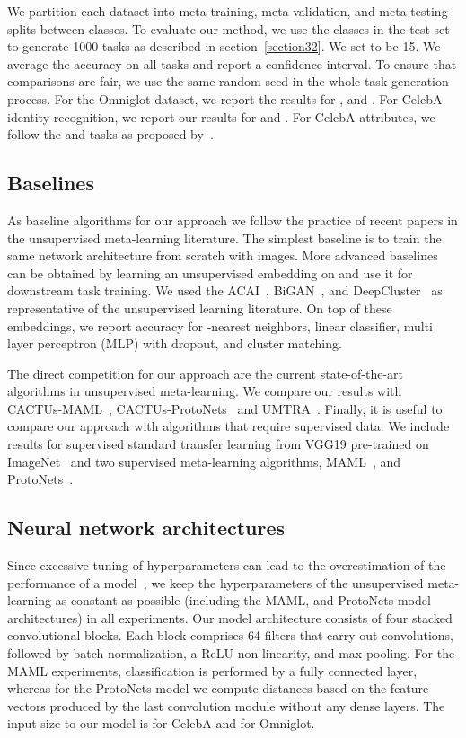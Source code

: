 \documentclass{article}
\begin{document}
We partition each dataset into meta-training, meta-validation, and meta-testing splits between classes. 
To evaluate our method, we use the classes in the test set to generate 1000 tasks as described in section~\ref{section32}. We set  to be 15.
We average the accuracy on all tasks and report a  confidence interval. To ensure that comparisons are fair, we use the same random seed in the whole task generation process. For the Omniglot dataset, we report the results for , and . For CelebA identity recognition, we report our results for  and . For CelebA attributes, we follow the  and  tasks as proposed by~\cite{hsu2018unsupervised}. 


\subsection{Baselines}


As baseline algorithms for our approach we follow the practice of recent papers in the unsupervised meta-learning literature. The simplest baseline is to train the same network architecture from scratch with  images. More advanced baselines can be obtained by learning an unsupervised  embedding on  and use it for downstream task training. We used the ACAI~\cite{berthelot*2018understanding}, BiGAN~\cite{donahue2016adversarial, dumoulin2016adversarially}, and DeepCluster~\cite{caron2018deep} as representative of the unsupervised learning literature. On top of these embeddings, we report accuracy for -nearest neighbors, linear classifier, multi layer perceptron (MLP) with dropout, and cluster matching.

The direct competition for our approach are the current state-of-the-art algorithms in unsupervised meta-learning. We compare our results with  CACTUs-MAML~\cite{hsu2018unsupervised}, CACTUs-ProtoNets~\cite{hsu2018unsupervised} and UMTRA~\cite{khodadadeh2019unsupervised}. Finally, it is useful to compare our approach with algorithms that require supervised data. We include results for supervised standard transfer learning from VGG19 pre-trained on ImageNet~\cite{simonyan2014very} and two supervised meta-learning algorithms, MAML~\cite{hsu2018unsupervised}, and ProtoNets~\cite{hsu2018unsupervised}.



\subsection{Neural network architectures}
Since excessive tuning of hyperparameters can lead to the overestimation of the performance of a model~\cite{Goodfellow-realistic}, we keep the hyperparameters of the unsupervised meta-learning as constant as possible (including the MAML, and ProtoNets model architectures) in all experiments. Our model architecture consists of four stacked convolutional blocks. Each block comprises 64 filters that carry out  convolutions, followed by batch normalization, a ReLU non-linearity, and  max-pooling. For the MAML experiments, classification is performed by a fully connected layer, whereas for the ProtoNets model we compute distances based on the feature vectors produced by the last convolution module without any dense layers. The input size to our model is  for CelebA and  for Omniglot.
\end{document}
